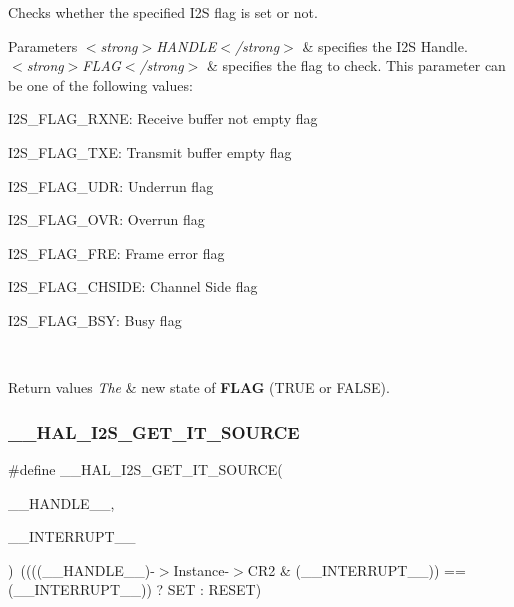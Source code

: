 Checks whether the specified I2S flag is set or not. 


\begin{DoxyParams}{Parameters}
{\em $<$strong$>$\+H\+A\+N\+D\+L\+E$<$/strong$>$} & specifies the I2S Handle. \\
\hline
{\em $<$strong$>$\+F\+L\+A\+G$<$/strong$>$} & specifies the flag to check. This parameter can be one of the following values\+: \begin{DoxyItemize}
\item I2\+S\+\_\+\+F\+L\+A\+G\+\_\+\+R\+X\+NE\+: Receive buffer not empty flag \item I2\+S\+\_\+\+F\+L\+A\+G\+\_\+\+T\+XE\+: Transmit buffer empty flag \item I2\+S\+\_\+\+F\+L\+A\+G\+\_\+\+U\+DR\+: Underrun flag \item I2\+S\+\_\+\+F\+L\+A\+G\+\_\+\+O\+VR\+: Overrun flag \item I2\+S\+\_\+\+F\+L\+A\+G\+\_\+\+F\+RE\+: Frame error flag \item I2\+S\+\_\+\+F\+L\+A\+G\+\_\+\+C\+H\+S\+I\+DE\+: Channel Side flag \item I2\+S\+\_\+\+F\+L\+A\+G\+\_\+\+B\+SY\+: Busy flag \end{DoxyItemize}
\\
\hline
\end{DoxyParams}

\begin{DoxyRetVals}{Return values}
{\em The} & new state of {\bfseries F\+L\+AG} (T\+R\+UE or F\+A\+L\+SE). \\
\hline
\end{DoxyRetVals}
\mbox{\label{group___i2_s___exported__macros_ga722512f6ff5e3bc5c6ef34ae2ab93f4e}} 
\subsubsection{\texorpdfstring{\+\_\+\+\_\+\+H\+A\+L\+\_\+\+I2\+S\+\_\+\+G\+E\+T\+\_\+\+I\+T\+\_\+\+S\+O\+U\+R\+CE}{\_\_HAL\_I2S\_GET\_IT\_SOURCE}}
{\footnotesize\ttfamily \#define \+\_\+\+\_\+\+H\+A\+L\+\_\+\+I2\+S\+\_\+\+G\+E\+T\+\_\+\+I\+T\+\_\+\+S\+O\+U\+R\+CE(\begin{DoxyParamCaption}\item[{}]{\+\_\+\+\_\+\+H\+A\+N\+D\+L\+E\+\_\+\+\_\+,  }\item[{}]{\+\_\+\+\_\+\+I\+N\+T\+E\+R\+R\+U\+P\+T\+\_\+\+\_\+ }\end{DoxyParamCaption})~((((\+\_\+\+\_\+\+H\+A\+N\+D\+L\+E\+\_\+\+\_\+)-\/$>$Instance-\/$>$C\+R2 \& (\+\_\+\+\_\+\+I\+N\+T\+E\+R\+R\+U\+P\+T\+\_\+\+\_\+)) == (\+\_\+\+\_\+\+I\+N\+T\+E\+R\+R\+U\+P\+T\+\_\+\+\_\+)) ? S\+ET \+: R\+E\+S\+ET)}



